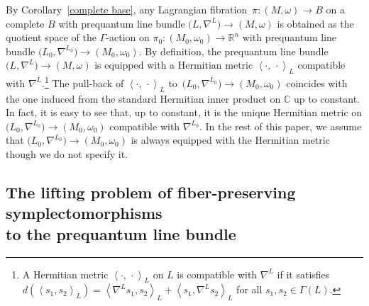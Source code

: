 \documentclass[pdftex]{sigma}
\numberwithin{equation}{section}
\newcommand{\C}{\mathbb{C}}
\newcommand{\R}{\mathbb{R}}
\def\<{\left\langle}
\def\>{\right\rangle}
\begin{document}
\begin{Remark}\label{Hermitian metric}
By Corollary~\ref{complete base}, any Lagrangian fibration~${\pi\colon (M,\omega)\to B}$ on a complete $B$ with prequantum line bundle $\bigl(L,\nabla^L\bigr)\to (M,\omega)$ is obtained as the quotient space of the $\Gamma$-action on $\pi_0\colon (M_0,\omega_0)\to \R^n$ with prequantum line bundle $\bigl( L_0, \nabla^{L_0}\bigr)
\to (M_0,\omega_0)$. By definition, the prequantum line bundle $\bigl(L,\nabla^L\bigr)\to (M,\omega)$ is equipped with a Hermitian metric $ \< \cdot , \, \cdot \>_L$ compatible with $\nabla^L$.\footnote{A Hermitian metric $ \< \cdot , \, \cdot \>_L$ on $L$ is compatible with $\nabla^L$ if it satisfies $d (\< s_1, s_2\>_L)=\<\nabla^L s_1, s_2\>_L +\< s_1, \nabla^L s_2\>_L$ for all $s_1, s_2\in \Gamma ( L)$. } The pull-back of $ \< \cdot , \, \cdot \>_L$ to~${\bigl( L_0, \nabla^{L_0}\bigr)\to (M_0,\omega_0)}$
coincides with the one induced from the standard Hermitian inner product on $\C$ up to constant. In fact, it is easy to see that, up to constant, it is the unique Hermitian metric on $\bigl( L_0, \nabla^{L_0}\bigr)\to (M_0,\omega_0)$
compatible with $\nabla^{L_0}$.
In the rest of this paper, we assume that $\bigl( L_0, \nabla^{L_0}\bigr)\to (M_0,\omega_0)$
is always equipped with the Hermitian metric though we do not specify it.
\end{Remark}


\subsection[The lifting problem of fiber-preserving symplectomorphisms to the prequantum line bundle]{The lifting problem of fiber-preserving symplectomorphisms \\ to the prequantum line bundle}
\end{document}

